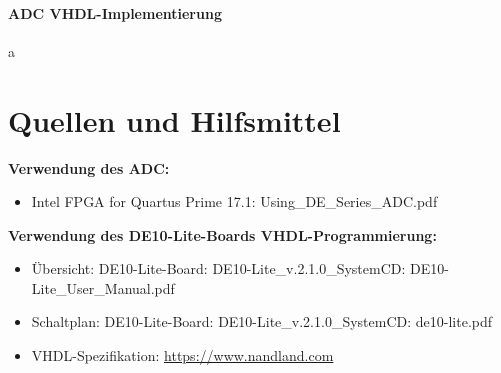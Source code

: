 \documentclass[a4paper,12pt]{article}
\begin{document}
\paragraph{ADC VHDL-Implementierung}
a

\section{Quellen und Hilfsmittel}
\textbf{Verwendung des ADC:}
\begin{itemize}
\item Intel FPGA for Quartus Prime 17.1: Using\_DE\_Series\_ADC.pdf
\end{itemize}
\textbf{Verwendung des DE10-Lite-Boards VHDL-Programmierung:}
\begin{itemize}
\item
Übersicht: DE10-Lite-Board: DE10-Lite\_v.2.1.0\_SystemCD: DE10-Lite\_User\_Manual.pdf
\item
\label{Schaltplan_FPGA}
Schaltplan: DE10-Lite-Board: DE10-Lite\_v.2.1.0\_SystemCD: de10-lite.pdf
\item
VHDL-Spezifikation: \url{https://www.nandland.com}
\end{itemize}
\end{document}
